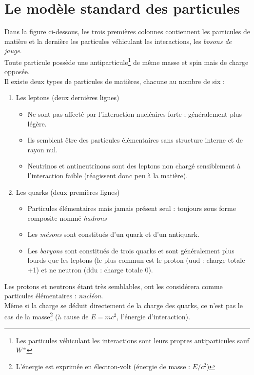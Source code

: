 \documentclass	[11pt, a4paper, openany]{book}
\begin{document}
\section{Le modèle standard des particules}
Dans la figure ci-dessous, les trois premières colonnes contiennent les particules de matière et la dernière les particules véhiculant les interactions, les \textit{bosons de jauge}.\\
Toute particule possède une antiparticule\footnote{Les particules véhiculant les interactions sont leurs propres antiparticules sauf $W^\pm$} de même masse et spin mais de charge opposée.\\

Il existe deux types de particules de matières, chacune au nombre de six : 
\begin{enumerate}
\item Les leptons (deux dernières lignes)
\begin{itemize}
\item Ne sont pas affecté par l'interaction nucléaires forte ; généralement plus légère.
\item Ils semblent être des particules élémentaires sans structure interne et de rayon nul.
\item Neutrinos et antineutrinons sont des leptons non chargé sensiblement à l'interaction faible (réagissent donc peu à la matière).
\end{itemize} 
\item Les quarks (deux premières lignes)
\begin{itemize}
\item Particules élémentaires mais jamais présent seul : toujours sous forme composite nommé \textit{hadrons}
\item Les \textit{mésons} sont constitués d'un quark et d'un antiquark.
\item Les \textit{baryons} sont constitués de trois quarks et sont généralement plus lourds que les leptons (le plus commun est le proton (uud : charge totale +1) et ne neutron (ddu : charge totale 0).
\end{itemize}
\end{enumerate}
Les protons et neutrons étant très semblables, ont les considérera comme particules élémentaires : \textit{nucléon}.\\
Même si la charge se déduit directement de la charge des quarks, ce n'est pas le cas de la masse\footnote{L'énergie est exprimée en électron-volt (énergie de masse : $E/c^2$)} (à cause de $E = mc^2$, l'énergie d'interaction).\\
\end{document}
